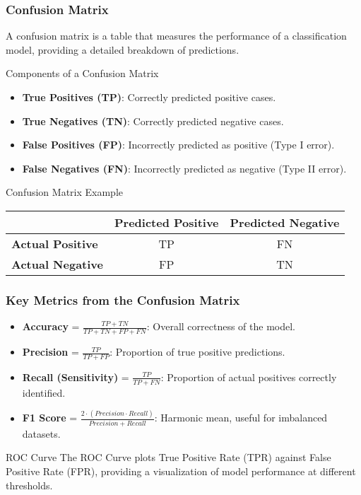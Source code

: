 \documentclass[aspectratio=169]{beamer}
\begin{document}
\begin{frame}[fragile]
  \frametitle{Confusion Matrix}
  A confusion matrix is a table that measures the performance of a classification model, providing a detailed breakdown of predictions.

  \begin{block}{Components of a Confusion Matrix}
    \begin{itemize}
      \item \textbf{True Positives (TP)}: Correctly predicted positive cases.
      \item \textbf{True Negatives (TN)}: Correctly predicted negative cases.
      \item \textbf{False Positives (FP)}: Incorrectly predicted as positive (Type I error).
      \item \textbf{False Negatives (FN)}: Incorrectly predicted as negative (Type II error).
    \end{itemize}
  \end{block}

  \begin{block}{Confusion Matrix Example}
    \begin{tabular}{|l|c|c|}
      \hline
                  & \textbf{Predicted Positive} & \textbf{Predicted Negative} \\ \hline
      \textbf{Actual Positive} & TP                            & FN                           \\ \hline
      \textbf{Actual Negative} & FP                            & TN                           \\ \hline
    \end{tabular}
  \end{block}
\end{frame}

\begin{frame}[fragile]
  \frametitle{Key Metrics from the Confusion Matrix}
  \begin{itemize}
    \item \textbf{Accuracy} = $\frac{TP + TN}{TP + TN + FP + FN}$: Overall correctness of the model.
    \item \textbf{Precision} = $\frac{TP}{TP + FP}$: Proportion of true positive predictions.
    \item \textbf{Recall (Sensitivity)} = $\frac{TP}{TP + FN}$: Proportion of actual positives correctly identified.
    \item \textbf{F1 Score} = $\frac{2 \cdot (Precision \cdot Recall)}{Precision + Recall}$: Harmonic mean, useful for imbalanced datasets.
  \end{itemize}
  
  \begin{block}{ROC Curve}
    The ROC Curve plots True Positive Rate (TPR) against False Positive Rate (FPR), providing a visualization of model performance at different thresholds.
  \end{block}
\end{frame}
\end{document}
